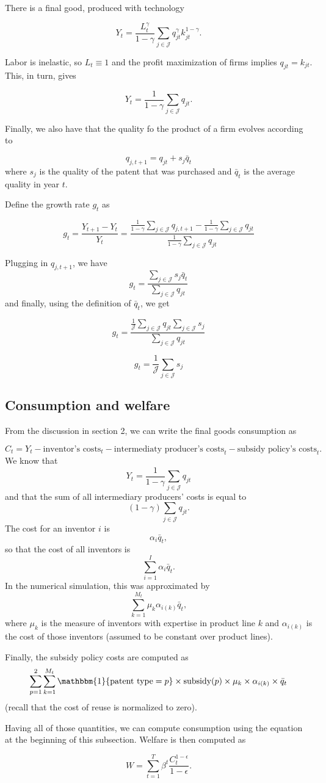 \documentclass[a4paper,11pt]{article}
\begin{document}
There is a final good, produced with technology

\[ Y_t = \frac{L_t^{\gamma}}{1-\gamma}\sum_{j \in \mathcal{J}} q_{jt}^{\gamma}k_{jt}^{1-\gamma}. \]

Labor is inelastic, so $L_t \equiv 1$ and the profit maximization of firms implies $q_{jt} = k_{jt}$. This, in turn, gives

\[ Y_t = \frac{1}{1-\gamma}\sum_{j \in \mathcal{J}}q_{jt}. \]

Finally, we also have that the quality fo the product of a firm evolves according to

\[ q_{j,t+1} = q_{jt} + s_j\bar{q}_t \]
where $s_j$ is the quality of the patent that was purchased and $\bar{q}_t$ is the average quality in year $t$. 

Define the growth rate $g_t$ as

\[ g_t = \frac{Y_{t+1} - Y_t}{Y_t} = \frac{\frac{1}{1-\gamma}\sum_{j \in \mathcal{J}}q_{j,t+1} - \frac{1}{1-\gamma}\sum_{j \in \mathcal{J}}q_{jt}}{\frac{1}{1-\gamma}\sum_{j \in \mathcal{J}}q_{jt}} \]

Plugging in $q_{j, t+1}$, we have
\[ g_t = \frac{\sum_{j \in \mathcal{J}}s_j \bar{q}_t}{\sum_{j \in \mathcal{J}}q_{jt}} \]
and finally, using the definition of $\bar{q}_t$, we get

\[ g_t = \frac{\frac{1}{\mathcal{J}}\sum_{j \in \mathcal{J}}q_{jt}\sum_{j \in \mathcal{J}}s_j}{\sum_{j \in \mathcal{J}}q_{jt}} \]

\[ g_t = \frac{1}{\mathcal{J}}\sum_{j \in \mathcal{J}}s_j \]


\subsection{Consumption and welfare}

From the discussion in section 2, we can write the final goods consumption as

\[ C_t = Y_t - \mbox{inventor's costs}_t - \mbox{intermediaty producer's costs}_t - \mbox{subsidy policy's costs}_t .\]
We know that
\[ Y_t = \frac{1}{1-\gamma}\sum_{j \in \mathcal{J}}q_{jt} \] and that the sum of all intermediary producers' costs is equal to 
\[ (1-\gamma)\sum_{j \in \mathcal{J}}q_{jt}. \]
The cost for an inventor $i$ is
\[ \alpha_i \bar{q}_t ,\]
so that the cost of all inventors is
\[ \sum_{i = 1}^{I}\alpha_i \bar{q}_t.\] In the numerical simulation, this was approximated by
\[ \sum_{k = 1}^{M_t} \mu_k \alpha_{i(k)} \bar{q}_t, \] where $\mu_k$ is the measure of inventors with expertise in product line $k$ and $\alpha_{i(k)}$ is the cost of those inventors (assumed to be constant over product lines).

Finally, the subsidy policy costs are computed as
\[ \sum_{p = 1}^2 \sum_{k = 1}^{M_t} \mathbbm{1}\{\mbox{patent type} = p\}\times \mbox{subsidy}(p) \times \mu_k \times \alpha_{i(k)}  \times \bar{q}_t\]
(recall that the cost of reuse is normalized to zero).

Having all of those quantities, we can compute consumption using the equation at the beginning of this subsection. Welfare is then computed as

\[ W = \sum_{t=1}^T \beta^t \frac{C_t^{1-\epsilon}}{1-\epsilon}. \]
\end{document}
